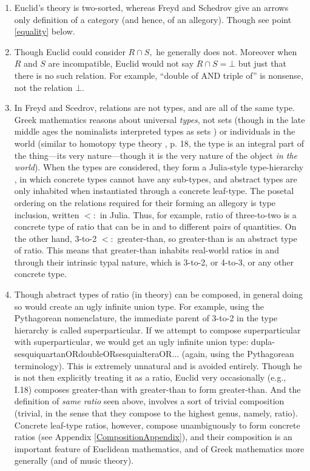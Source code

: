 \documentclass[11pt]{article}
\begin{document}
\begin{enumerate}
\item Euclid's theory is two-sorted, whereas Freyd and Schedrov give an arrows only definition of a category (and hence, of an allegory). Though see point \ref{equality} below.

\item Though Euclid could consider $R \cap S,$ he generally does not. Moreover when $R$ and $S$ are incompatible, Euclid would not say $R\cap S = \bot$ but just that there is no such relation. For example, ``double of AND triple of'' is nonsense, not the relation $\bot$.

\item In Freyd and Scedrov, relations are not types, and are all of the same type. Greek mathematics reasons about universal \textit{types}, not sets (though in the late middle ages the nominalists interpreted types as sets \citep{johnofstthomas1883logica}) or individuals in the world (similar to homotopy type theory \citep{hottbook}, p. 18, the type is an integral part of the thing---its very nature---though it is the very nature of the object \textit{in the world}). When the types are considered, they form a Julia-style type-hierarchy \citep{juliatypes2026}, in which concrete types cannot have any sub-types, and abstract types are only inhabited when instantiated through a concrete leaf-type. The posetal ordering on the relations required for their forming an allegory is type inclusion, written $<:$ in Julia. Thus, for example, ratio of three-to-two is a concrete type of ratio that can be in and to different pairs of quantities. On the other hand, 3-to-2 $<:$ greater-than, so greater-than is an abstract type of ratio. This means that greater-than inhabits real-world ratios in and through their intrinsic typal nature, which is 3-to-2, or 4-to-3, or any other concrete type.

\item Though abstract types of ratio (in theory) can be composed, in general doing so would create an ugly infinite union type. For example, using the Pythagorean nomenclature, the immediate parent of 3-to-2 in the type hierarchy is called superparticular. If we attempt to compose superparticular with superparticular, we would get an ugly infinite union type: dupla-sesquiquartanORdoubleORsesquialteraOR... (again, using the Pythagorean terminology). This is extremely unnatural and is avoided entirely. Though he is not then explicitly treating it as a ratio, Euclid very occasionally (e.g., I.18) composes greater-than with greater-than to form greater-than. And the definition of \textit{same ratio} seen above, involves a sort of trivial composition (trivial, in the sense that they compose to the highest genus, namely, ratio). Concrete leaf-type ratios, however, compose unambiguously to form concrete ratios (see Appendix \ref{CompositionAppendix}), and their composition is an important feature of Euclidean mathematics, and of Greek mathematics more generally (and of music theory).


\end{enumerate}
\end{document}
